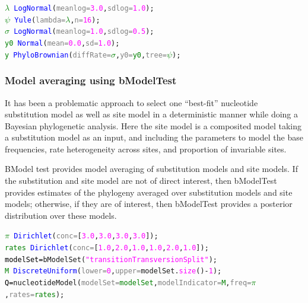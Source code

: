 \documentclass[10pt,letterpaper,table]{article}
\begin{document}
{{\small
\begin{alltt}
    \textcolor{green}{\(\lambda\)} ~ \textcolor{blue}{LogNormal}(\textcolor{gray}{meanlog=}\textcolor{magenta}{3.0}, \textcolor{gray}{sdlog=}\textcolor{magenta}{1.0});
    \textcolor{green}{\(\psi\)} ~ \textcolor{blue}{Yule}(\textcolor{gray}{lambda=}\textcolor{green}{\(\lambda\)}, \textcolor{gray}{n=}\textcolor{magenta}{16});
    \textcolor{green}{\(\sigma\)} ~ \textcolor{blue}{LogNormal}(\textcolor{gray}{meanlog=}\textcolor{magenta}{1.0}, \textcolor{gray}{sdlog=}\textcolor{magenta}{0.5});
    \textcolor{green}{y0} ~ \textcolor{blue}{Normal}(\textcolor{gray}{mean=}\textcolor{magenta}{0.0}, \textcolor{gray}{sd=}\textcolor{magenta}{1.0});
    \textcolor{green}{y} ~ \textcolor{blue}{PhyloBrownian}(\textcolor{gray}{diffRate=}\textcolor{green}{\(\sigma\)}, \textcolor{gray}{y0=}\textcolor{green}{y0}, \textcolor{gray}{tree=}\textcolor{green}{\(\psi\)});
\end{alltt}
}

\subsubsection{Model averaging using bModelTest}

It has been a problematic approach to select one ``best-fit'' nucleotide substitution model as well as site model in a deterministic manner while doing a Bayesian phylogenetic analysis. Here the site model is a composited model taking a substitution model as an input, and including the parameters to model the base frequencies, rate heterogeneity across sites, and proportion of invariable sites.

BModel test \cite{bouckaert2017bmodeltestcomparison} provides model averaging of substitution models and site models. 
If the substitution and site model are not of direct interest, then bModelTest provides estimates of the phylogeny averaged over substitution models and site models; otherwise, if they are of interest, then bModelTest provides a posterior distribution over these models. \cite{bouckaert2019beastanalysis}

{\small
  \begin{alltt}
    \textcolor{green}{\(\pi\)} ~ \textcolor{blue}{Dirichlet}(\textcolor{gray}{conc=}[\textcolor{magenta}{3.0}, \textcolor{magenta}{3.0}, \textcolor{magenta}{3.0}, \textcolor{magenta}{3.0}]);
    \textcolor{green}{rates} ~ \textcolor{blue}{Dirichlet}(\textcolor{gray}{conc=}[\textcolor{magenta}{1.0}, \textcolor{magenta}{2.0}, \textcolor{magenta}{1.0}, \textcolor{magenta}{1.0}, \textcolor{magenta}{2.0}, \textcolor{magenta}{1.0}]);
    \textcolor{black}{modelSet = }\textcolor{magenta!80!black}{bModelSet}(\textcolor{magenta}{"transitionTransversionSplit"});
    \textcolor{green}{M} ~ \textcolor{blue}{DiscreteUniform}(\textcolor{gray}{lower=}\textcolor{magenta}{0}, \textcolor{gray}{upper=}modelSet.\textcolor{magenta}{size}()-\textcolor{magenta}{1});
    \textcolor{black}{Q = }\textcolor{magenta!80!black}{nucleotideModel}(\textcolor{gray}{modelSet=}\textcolor{green}{modelSet}, \textcolor{gray}{modelIndicator=}\textcolor{green}{M}, \textcolor{gray}{freq=}\textcolor{green}{\(\pi\)}, \textcolor{gray}{rates=}\textcolor{green}{rates});
\end{alltt}
}

}
\end{document}

